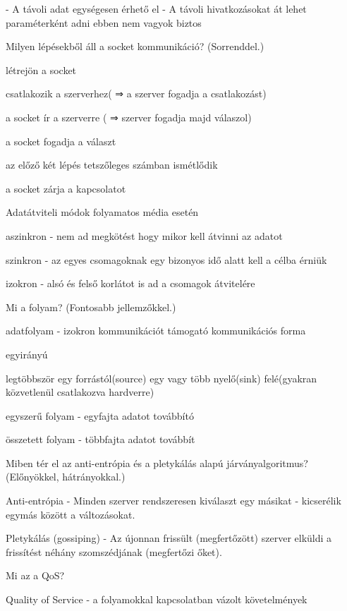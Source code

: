 \documentclass[12pt]{article}
\begin{document}
\begin{description}
        - A távoli adat egységesen érhető el
        - A távoli hivatkozásokat át lehet paraméterként adni
        ebben nem vagyok biztos
    \item  Milyen lépésekből áll a socket kommunikáció? (Sorrenddel.)
    \item létrejön a socket
    \item csatlakozik a szerverhez( ⇒ a szerver fogadja a csatlakozást)
    \item a socket ír a szerverre ( ⇒ szerver fogadja majd válaszol)
    \item a socket fogadja a választ
    \item az előző két lépés tetszőleges számban ismétlődik
    \item a socket zárja a kapcsolatot
    \item  Adatátviteli módok folyamatos média esetén
    \item aszinkron
        - nem ad megkötést hogy mikor kell átvinni az adatot
    \item szinkron
        - az egyes csomagoknak egy bizonyos idő alatt kell a célba érniük
    \item izokron 
        - alsó és felső korlátot is ad a csomagok átvitelére
    \item  Mi a folyam? (Fontosabb jellemzőkkel.)
    \item adatfolyam
        - izokron kommunikációt támogató kommunikációs forma
    \item egyirányú
    \item legtöbbször egy forrástól(source) egy vagy több nyelő(sink) felé(gyakran közvetlenül csatlakozva hardverre)
    \item egyszerű folyam
        - egyfajta adatot továbbító
    \item összetett folyam
        - többfajta adatot továbbít
    \item  Miben tér el az anti-entrópia és a pletykálás alapú járványalgoritmus? (Előnyökkel, hátrányokkal.)
    \item Anti-entrópia
        - Minden szerver rendszeresen kiválaszt egy másikat
        - kicserélik egymás között a változásokat.
    \item Pletykálás (gossiping)
        - Az újonnan frissült (megfertőzött) szerver elküldi a frissítést néhány szomszédjának (megfertőzi őket).
    \item  Mi az a QoS?
    \item Quality of Service 
        - a folyamokkal kapcsolatban vázolt követelmények

\end{description}
\end{document}
